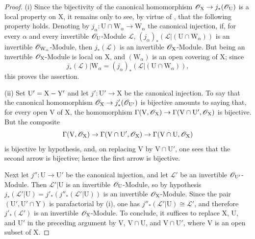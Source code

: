 \begin{proof}
(i) Since the bijectivity of the canonical homomorphism $\mathscr{O}_{\mathrm{X}}\to j_*(\mathscr{O}_{\mathrm{U}})$ is a local property on $\mathrm{X}$, it remains only to see, by virtue of , that the following property holds. Denoting by $j_\alpha:\mathrm{U}\cap\mathrm{W}_\alpha\to\mathrm{W}_\alpha$ the canonical injection, if, for every $\alpha$ and every invertible $\mathscr{O}_{\mathrm{U}}$-Module $\mathscr{L}$, $(j_\alpha)_*(\mathscr{L}|(\mathrm{U}\cap\mathrm{W}_\alpha))$ is an invertible $\mathscr{O}_{\mathrm{W}_\alpha}$-Module, then $j_*(\mathscr{L})$ is an invertible $\mathscr{O}_{\mathrm{X}}$-Module.
But being an invertible $\mathscr{O}_{\mathrm{X}}$-Module is local on $\mathrm{X}$, and $(\mathrm{W}_\alpha)$ is an open covering of $\mathrm{X}$; since
\[
  j_*(\mathscr{L})|\mathrm{W}_\alpha=(j_\alpha)_*(\mathscr{L}|(\mathrm{U}\cap\mathrm{W}_\alpha)),
\]
this proves the assertion.

(ii) Set $\mathrm{U}'=\mathrm{X}-\mathrm{Y}'$ and let $j':\mathrm{U}'\to\mathrm{X}$ be the canonical injection.
To say that the canonical homomorphism $\mathscr{O}_{\mathrm{X}}\to j'_*(\mathscr{O}_{\mathrm{U}'})$ is bijective amounts to saying that, for every open $\mathrm{V}$ of $\mathrm{X}$, the homomorphism $\Gamma(\mathrm{V},\mathscr{O}_{\mathrm{X}})\to\Gamma(\mathrm{V}\cap\mathrm{U}',\mathscr{O}_{\mathrm{X}})$ is bijective. But the composite
\[
  \Gamma(\mathrm{V},\mathscr{O}_{\mathrm{X}})\to\Gamma(\mathrm{V}\cap\mathrm{U}',\mathscr{O}_{\mathrm{X}})\to\Gamma(\mathrm{V}\cap\mathrm{U},\mathscr{O}_{\mathrm{X}})
\]
is bijective by hypothesis, and, on replacing $\mathrm{V}$ by $\mathrm{V}\cap\mathrm{U}'$, one sees that the second arrow is bijective; hence the first arrow is bijective.

Next let $j'':\mathrm{U}\to\mathrm{U}'$ be the canonical injection, and let $\mathscr{L}'$ be an invertible $\mathscr{O}_{\mathrm{U}'}$-Module. Then $\mathscr{L}'|\mathrm{U}$ is an invertible $\mathscr{O}_{\mathrm{U}}$-Module, so by hypothesis $j_*(\mathscr{L}'|\mathrm{U})=j'_*(j''_*(\mathscr{L}'|\mathrm{U}))$
is an invertible $\mathscr{O}_{\mathrm{X}}$-Module. Since the pair $(\mathrm{U}',\mathrm{U}'\cap\mathrm{Y})$ is parafactorial by (i), one has $j''_*(\mathscr{L}'|\mathrm{U})\cong\mathscr{L}'$, and therefore $j'_*(\mathscr{L}')$ is an invertible $\mathscr{O}_{\mathrm{X}}$-Module. To conclude, it suffices to replace $\mathrm{X}$, $\mathrm{U}$, and $\mathrm{U}'$ in the preceding argument by $\mathrm{V}$, $\mathrm{V}\cap\mathrm{U}$, and $\mathrm{V}\cap\mathrm{U}'$, where $\mathrm{V}$ is an open subset of $\mathrm{X}$.


\end{proof}
